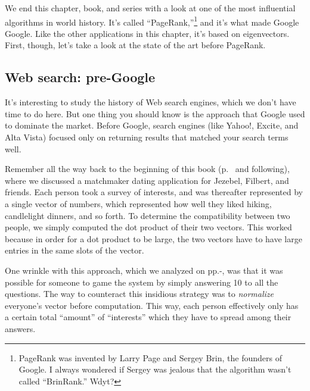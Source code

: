 \begin{alttitles}

We end this chapter, book, and series with a look at one of the most
influential algorithms in world history. It's called
``PageRank,''\footnote{PageRank was invented by 
  Larry Page and Sergey Brin, the founders of
Google. I always wondered if Sergey was jealous that the algorithm wasn't
called ``BrinRank.'' Wdyt?} and it's what made Google Google. Like the other
applications in this chapter, it's based on eigenvectors. First, though, let's
take a look at the state of the art before PageRank.

\subsection{Web search: pre-Google}
\label{sec:webSearchPreGoogle}


It's interesting to study the history of Web search engines, which we don't
have time to do here. But one thing you should know is the approach that Google
used to dominate the market. Before Google, search engines (like Yahoo!,
Excite, and Alta Vista) focused only on returning results that matched your
search terms well.


Remember all the way back to the beginning of this book
(p.~\pageref{matchmakerExample} and following), where we discussed a matchmaker
dating application for Jezebel, Filbert, and friends. Each person took a survey
of interests, and was thereafter represented by a single vector of numbers,
which represented how well they liked hiking, candlelight dinners, and so
forth. To determine the compatibility between two people, we simply computed
the dot product of their two vectors. This worked because in order for a dot
product to be large, the two vectors have to have large entries in the same
slots of the vector.


One wrinkle with this approach, which we analyzed on
pp.\pageref{matchmakerGameTheSystemStart}-\pageref{matchmakerGameTheSystemEnd},
was that it was possible for someone to game the system by simply answering 10
to all the questions. The way to counteract this insidious strategy was to
\textit{normalize} everyone's vector before computation. This way, each person
effectively only has a certain total ``amount'' of ``interests'' which they
have to spread among their answers.


\end{alttitles}
